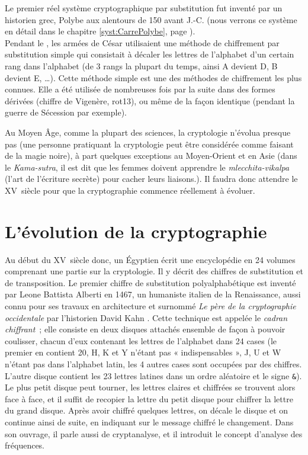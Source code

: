 Le premier réel système cryptographique par substitution fut inventé
par un historien grec, Polybe aux alentours de 150 avant J.-C. (nous
verrons ce système en détail dans le chapitre
\ref{syst:CarrePolybe}, page
\pageref{syst:CarrePolybe}). \\

\label{syst:ChiffreCesar}
Pendant le , les armées de César utilisaient une méthode de
chiffrement par substitution simple qui consistait à décaler les
lettres de l'alphabet d'un certain rang dans l'alphabet (de 3 rangs la
plupart du temps, ainsi A devient D, B devient E, \dots). Cette 
méthode simple est une des méthodes de chiffrement les plus
connues. Elle a été
utilisée de nombreuses fois par la suite dans des formes dérivées (chiffre de
Vigenère, rot13), ou même
de la façon identique (pendant la guerre de Sécession par exemple).

Au Moyen Âge, comme la plupart des sciences, la cryptologie n'évolua
presque pas (une personne pratiquant la cryptologie peut être
considérée comme faisant de la magie noire), à part quelques exceptions
au Moyen-Orient et en Asie (dans le \emph{Kama-sutra}, il est dit que les
femmes doivent apprendre le \emph{mlecchita-vikalpa} (l'art de
l'écriture secrète) pour cacher leurs liaisons.). Il faudra donc
attendre le XV\ieme~siècle pour que la cryptographie commence
réellement à évoluer. \\

\section{L'évolution de la cryptographie}
Au début du XV\ieme~siècle donc, un Égyptien écrit une encyclopédie
en 24 volumes comprenant une partie sur la cryptologie. Il y décrit des
chiffres de substitution et de transposition. Le premier chiffre de
substitution polyalphabétique
est inventé par Leone Battista Alberti en 1467, un humaniste italien
de la Renaissance, aussi connu pour ses travaux en architecture et
surnommé \emph{Le père de la cryptographie occidentale} par
l'historien David Kahn \cite{Codebreakers}. Cette technique est appelée
le \emph{cadran chiffrant}\label{syst:CadranChiffrant}~; elle consiste
en deux disques attachés ensemble de façon à pouvoir coulisser,
chacun d'eux contenant les lettres de l'alphabet dans 24 cases (le premier
en contient 20, H, K et Y n'étant pas « indispensables », J, U et W
n'étant pas dans l'alphabet latin, les 4 autres cases sont occupées
par des chiffres. L'autre disque contient les 23 lettres latines dans
un ordre aléatoire et le signe \texttt{\&}). Le plus petit disque peut tourner,
les lettres claires et chiffrées se trouvent alors face à face, et il
suffit de recopier la lettre du petit disque pour chiffrer la lettre
du grand disque. Après avoir chiffré quelques lettres, on décale le
disque et on continue ainsi de suite, en indiquant sur le message
chiffré le changement. Dans son ouvrage, il parle aussi de
cryptanalyse, et il introduit le concept d'analyse des
fréquences. \\

